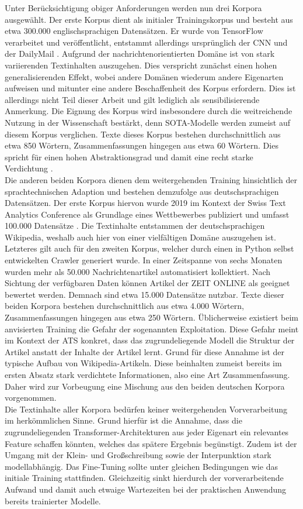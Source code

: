 \noindent
Unter Berücksichtigung obiger Anforderungen werden nun drei Korpora ausgewählt. Der erste Korpus dient als initialer Trainingskorpus und besteht aus etwa 300.000 englischsprachigen Datensätzen. Er wurde von TensorFlow verarbeitet und veröffentlicht, entstammt allerdings ursprünglich der CNN und der DailyMail \cite{TEN21}. Aufgrund der nachrichtenorientierten Domäne ist von stark variierenden Textinhalten auszugehen. Dies verspricht zunächst einen hohen generalisierenden Effekt, wobei andere Domänen wiederum andere Eigenarten aufweisen und mitunter eine andere Beschaffenheit des Korpus erfordern. Dies ist allerdings nicht Teil dieser Arbeit und gilt lediglich als sensibilisierende Anmerkung. Die Eignung des Korpus wird insbesondere durch die weitreichende Nutzung in der Wissenschaft bestärkt, denn \ac{SOTA}-Modelle werden zumeist auf diesem Korpus verglichen. Texte dieses Korpus bestehen durchschnittlich aus etwa 850 Wörtern, Zusammenfassungen hingegen aus etwa 60 Wörtern. Dies spricht für einen hohen Abstraktionsgrad und damit eine recht starke Verdichtung \cite[S.~6]{ROT20}.\\

Die anderen beiden Korpora dienen dem weitergehenden Training hinsichtlich der sprachtechnischen Adaption und bestehen demzufolge aus deutschsprachigen Datensätzen. Der erste Korpus hiervon wurde 2019 im Kontext der Swiss Text Analytics Conference als Grundlage eines Wettbewerbes publiziert und umfasst 100.000 Datensätze \cite{CIE19}. Die Textinhalte entstammen der deutschsprachigen Wikipedia, weshalb auch hier von einer vielfältigen Domäne auszugehen ist. Letzteres gilt auch für den zweiten Korpus, welcher durch einen in Python selbst entwickelten Crawler generiert wurde. In einer Zeitspanne von sechs Monaten wurden mehr als 50.000 Nachrichtenartikel automatisiert kollektiert. Nach Sichtung der verfügbaren Daten können Artikel der ZEIT ONLINE als geeignet bewertet werden. Demnach sind etwa 15.000 Datensätze nutzbar. Texte dieser beiden Korpora bestehen durchschnittlich aus etwa 4.000 Wörtern, Zusammenfassungen hingegen aus etwa 250 Wörtern. Üblicherweise existiert beim anvisierten Training die Gefahr der sogenannten Exploitation. Diese Gefahr meint im Kontext der \ac{ATS} konkret, dass das zugrundeliegende Modell die Struktur der Artikel anstatt der Inhalte der Artikel lernt. Grund für diese Annahme ist der typische Aufbau von Wikipedia-Artikeln. Diese beinhalten zumeist bereits im ersten Absatz stark verdichtete Informationen, also eine Art Zusammenfassung. Daher wird zur Vorbeugung eine Mischung aus den beiden deutschen Korpora vorgenommen.\\

Die Textinhalte aller Korpora bedürfen keiner weitergehenden Vorverarbeitung im herkömmlichen Sinne. Grund hierfür ist die Annahme, dass die zugrundeliegenden Transformer-Architekturen aus jeder Eigenart ein relevantes Feature schaffen könnten, welches das spätere Ergebnis begünstigt. Zudem ist der Umgang mit der Klein- und Großschreibung sowie der Interpunktion stark modellabhängig. Das Fine-Tuning sollte unter gleichen Bedingungen wie das initiale Training stattfinden. Gleichzeitig sinkt hierdurch der vorverarbeitende Aufwand und damit auch etwaige Wartezeiten bei der praktischen Anwendung bereits trainierter Modelle.
